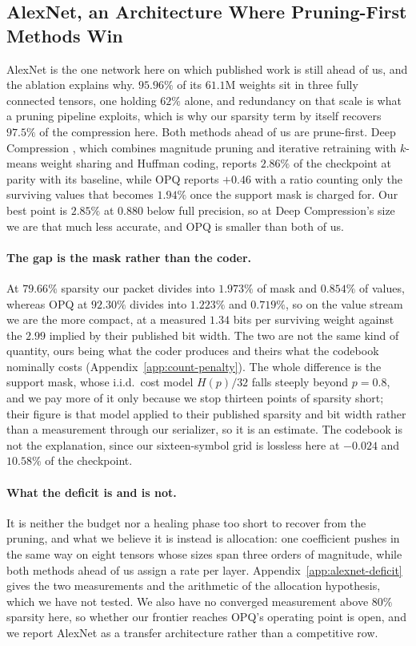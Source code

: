 \documentclass{article}
\begin{document}
\subsection{AlexNet, an Architecture Where Pruning-First Methods Win}
\label{sec:alexnet-pruning}

AlexNet is the one network here on which published work is still ahead of us, and
the ablation explains why. $95.96\%$ of its $61.1$M weights sit in three fully
connected tensors, one holding $62\%$ alone, and redundancy on that scale is what
a pruning pipeline exploits, which is why our sparsity term by itself recovers
$97.5\%$ of the compression here. Both methods ahead of us are prune-first. Deep
Compression \citep{han2016deep}, which combines magnitude pruning and iterative
retraining with $k$-means weight sharing and Huffman coding, reports $2.86\%$ of
the checkpoint at parity with its baseline, while OPQ \citep{hu2021opq} reports
$+0.46$ with a ratio counting only the surviving values that becomes $1.94\%$ once
the support mask is charged for. Our best point is $2.85\%$ at $0.880$ below full
precision, so at Deep Compression's size we are that much less accurate, and OPQ
is smaller than both of us.

\paragraph{The gap is the mask rather than the coder.} At $79.66\%$ sparsity our
packet divides into $1.973\%$ of mask and $0.854\%$ of values, whereas OPQ at
$92.30\%$ divides into $1.223\%$ and $0.719\%$, so on the value stream we are the
more compact, at a measured $1.34$ bits per surviving weight against the $2.99$
implied by their published bit width. The two are not the same kind of quantity,
ours being what the coder produces and theirs what the codebook nominally costs
(Appendix~\ref{app:count-penalty}). The whole
difference is the support mask, whose i.i.d.\ cost model $H(p)/32$ falls steeply
beyond $p=0.8$, and we pay more of it only because we stop thirteen points of
sparsity short; their figure is that model applied to their published sparsity and
bit width rather than a measurement through our serializer, so it is an estimate.
The codebook is not the explanation, since our sixteen-symbol grid is lossless
here at $-0.024$ and $10.58\%$ of the checkpoint.

\paragraph{What the deficit is and is not.} It is neither the budget nor a healing
phase too short to recover from the pruning, and what we believe it is instead is
allocation: one coefficient pushes in the same way on eight tensors whose sizes
span three orders of magnitude, while both methods ahead of us assign a rate per
layer. Appendix~\ref{app:alexnet-deficit} gives the two measurements and the
arithmetic of the allocation hypothesis, which we have not tested. We also have no
converged measurement above $80\%$ sparsity here, so whether our frontier reaches
OPQ's operating point is open, and we report AlexNet as a transfer architecture
rather than a competitive row.
\end{document}
